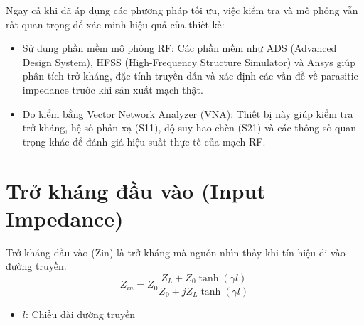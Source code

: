 \hspace{13pt} Ngay cả khi đã áp dụng các phương pháp tối ưu, việc kiểm tra và mô phỏng vẫn rất quan trọng để xác minh hiệu quả của thiết kế:
\begin{itemize}
    \item Sử dụng phần mềm mô phỏng RF: Các phần mềm như ADS (Advanced Design System), HFSS (High-Frequency Structure Simulator) và Ansys giúp phân tích trở kháng, đặc tính truyền dẫn và xác định các vấn đề về parasitic impedance trước khi sản xuất mạch thật.
    \item Đo kiểm bằng Vector Network Analyzer (VNA): Thiết bị này giúp kiểm tra trở kháng, hệ số phản xạ (S11), độ suy hao chèn (S21) và các thông số quan trọng khác để đánh giá hiệu suất thực tế của mạch RF.
\end{itemize}

    \section{Trở kháng đầu vào (Input Impedance)}
        Trở kháng đầu vào (Zin) là trở kháng mà nguồn nhìn thấy khi tín hiệu đi vào đường truyền.
        \begin{equation}
            Z_{in} = Z_0 \frac{Z_L + Z_0 \tanh(\gamma l)}{Z_0 + jZ_L \tanh(\gamma l)}
            \label{eq:zin}    
        \end{equation}
        
        \begin{itemize}
            \item $l$: Chiều dài đường truyền
        \end{itemize}